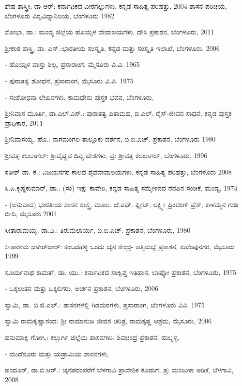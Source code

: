 \noindent
ಶೇಷ ಶಾಸ್ತ್ರೀ, ಡಾ ಆರ್​: ಕರ್ನಾಟಕದ ವೀರಗಲ್ಲುಗಳು, ಕನ್ನಡ ಸಾಹಿತ್ಯ ಪರಿಷತ್ತು, 2004 ಶಾಸನ ಪರಿಚಯ, ಬೆಂಗಳೂರು ವಿಶ್ವವಿದ್ಯಾನಿಲಯ, ಬೆಂಗಳೂರು 1982

\noindent
ಶೋಭಾ, ಡಾ.: ಮಂಡ್ಯ ಜಿಲ್ಲೆಯ ಹೊಯ್ಸಳ ದೇವಾಲಯಗಳು, ದೇಸಿ ಪ್ರಕಾಶನ, ಬೆಂಗಳೂರು, 2011

\noindent
ಶ‍್ರೀಕಂಠ ಶಾಸ್ತ್ರಿ, ಡಾ. ಎಸ್​.:ಭಾರತೀಯ ಸಂಸ್ಕೃತಿ, ಕನ್ನಡ ಮತ್ತು ಸಂಸ್ಕೃತಿ ಇಲಾಖೆ, ಬೆಂಗಳೂರು, 2006

- ಹೊಯ್ಸಳ ವಾಸ್ತು ಶಿಲ್ಪ, ಪ್ರಸಾರಾಂಗ, ಮೈಸೂರು ವಿ.ವಿ. 1965

- ಪುರಾತತ್ವ ಶೋಧನೆ, ಪ್ರಸಾರಾಂಗ, ಮೈಸೂರು ವಿ.ವಿ. 1975

- ಸಂಶೋಧನಾ ಲೇಖನಗಳು, ಕಾಮಧೇನು ಪುಸ್ತಕ ಭವನ, ಬೆಂಗಳೂರು,

\noindent
ಶ‍್ರೀನಿವಾಸ ಮೂರ್ತಿ, ಡಾ.ಎಲ್​.ಎಸ್​.: ಪುರಾತತ್ವ ಪಿತಾಮಹ, ಬಿ.ಎಲ್​. ರೈಸ್​-ಜೀವನ ಸಾಧನೆ, ಕನ್ನಡ ಪುಸ್ತಕ ಪ್ರಾಧಿಕಾರ, 2011

\noindent
ಶ‍್ರೀನಿವಾಸಯ್ಯ, ಹೊ.: ನಾಗಮಂಗಲ ತಾಲ್ಲೂಕು ದರ್ಶನ, ಐ.ಬಿ.ಎಚ್​. ಪ್ರಕಾಶನ, ಬೆಂಗಳೂರು 1980

\noindent
ಶ‍್ರೀವತ್ಸ ಕಲಬಾಗಲ್​: ಶ‍್ರೀವೈಷ್ಣವ ದಿವ್ಯ ದೇಶಗಳು, ಪ್ರ: ಶ‍್ರೀವತ್ಸ ಕಲಬಾಗಲ್​, ಬೆಂಗಳೂರು, 1996

\noindent
ಸತೀಶ್​ ಡಾ. ಕೆ.: ವಿಜಯನಗರ ಕಾಲದ ಶೈವದೇವಾಲಯಗಳು, ಕನ್ನಡ ಸಾಹಿತ್ಯ ಪರಿಷತ್ತು, ಬೆಂಗಳೂರು 2008

\noindent
ಸಿ.ಪಿ.ಕೃಷ್ಣಕುಮಾರ್​, ಡಾ.: (ಸಂ) ಇಕ್ಷು ಕಾವೇರಿ, ಕನ್ನಡ ಸಾಹಿತ್ಯ ಸಮ್ಮೇಳನದ ನೆನಪಿನ ಸಂಚಿಕೆ, ಮಂಡ್ಯ, 1974

- (ಅನುವಾದ) ಭಾರತೀಯ ಶಾಸನ ಶಾಸ್ತ್ರ, ಮೂಲ. ಜೆ.ಎಫ್​. ಫ್ಲೀಟ್​, ಲಕ್ಷ್ಮೀ ಪ್ರಿಂಟಿಂಗ್​ ಪ್ರೆಸ್​, ಕಾಳಮ್ಮನ ಗುಡಿ ಬೀದಿ, ಮೈಸೂರು 2001

\noindent
ಸೀತಾರಾಮಯ್ಯ, ಡಾ.ವಿ.: ತಿರುಮಲಾರ್ಯ, ಐ.ಬಿ.ಎಚ್​. ಪ್ರಕಾಶನ, ಬೆಂಗಳೂರು, 1980

\noindent
ಸೀತಾರಾಮ ಜಾಗಿರ್​ದಾರ್​: ಕಂಬದಹಳ್ಳಿ ಒಂದು ಜೈನ ಕೇಂದ್ರ- ಅತ್ತಿಮಬ್ಬೆ ಪ್ರಕಾಶನ, ಕುವೆಂಪುನಗರ, ಮೈಸೂರು 1999

\noindent
ಸೂರ್ಯನಾಥ ಕಾಮತ್​, ಡಾ. ಯು.: ಕರ್ನಾಟಕದ ಸಂಕ್ಷಿಪ್ತ ಇತಿಹಾಸ, ಬಾಪ್ಕೋ ಪ್ರಕಾಶನ, ಬೆಂಗಳೂರು, 1975

- ಒಕ್ಕಲುತನ ಮತ್ತು ಒಕ್ಕಲಿಗರು, ಅರ್ಚನ ಪ್ರಕಾಶನ, ಬೆಂಗಳೂರು, 2006

\noindent
ಸ್ವಾಮಿ, ಡಾ. ಬಿ.ಜಿ.ಎಲ್​.: ಶಾಸನಗಳಲ್ಲಿ ಗಿಡಮರಗಳು, ಪ್ರಸಾರಾಂಗ, ಬೆಂಗಳೂರು ವಿವಿ. 1975

\noindent
ಸ್ವಾಮಿ ರಾಮಕೃಷ್ಣಾನಂದ: ಶ‍್ರೀ ರಾಮಾನುಜ ಜೀವನ ಚರಿತ್ರೆ, ರಾಮಕೃಷ್ಣ ಆಶ್ರಮ, ಮೈಸೂರು, 2006

\noindent
ಹನುಮಾಕ್ಷಿ ಗೋಗಿ,: ಕಲ್ಬುರ್ಗಿ ಜಿಲ್ಲೆಯ ಶಾಸನಗಳು, ಶಿವಚಂದ್ರ ಪ್ರಕಾಶನ, ಹುಬ್ಬಳ್ಳಿ,

- ಮುದೆನೂರು ಮತ್ತು ಯಡ್ರಾಮಿಯ ಶಾಸನಗಳು,

\noindent
ಹಂದೂರ್​, ಡಾ.ಬಿ.ಆರ್​.: ಜೈನಪರಂಪರೆಗೆ ಬೆಳಗಾವಿ ಪ್ರಾದೇಶಿಕ ಕೊಡುಗೆ, ಪ್ರ: ಮಂಜುಳಾ ಅಡಿಕೆ, ಬೆಳಗಾವಿ, 2008

